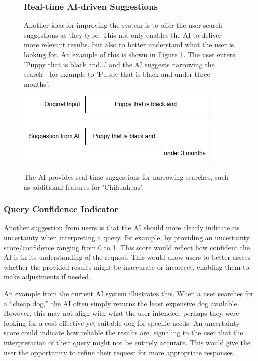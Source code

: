 \documentclass[../../submission.tex]{subfiles}
\begin{document}
\begin{figure}[h]
    \centering
    \begin{minipage}{0.35\textwidth}
        \subsubsection{Real-time AI-driven Suggestions}
        Another idea for improving the system is to offer the user search suggestions as they type. 
        This not only enables the AI to deliver more relevant results, but also to better understand what the user is looking for.
        An example of this is shown in Figure \ref{fig:suggestions}. The user enters 'Puppy that is black and...' and the AI suggests narrowing the 
        search - for example to 'Puppy that is black and under three months'.
    \end{minipage}
    \hfill
    \begin{minipage}{0.55\textwidth}
        \includegraphics[width=\textwidth]{images/vorschlag}
        \caption{The AI provides real-time suggestions for narrowing searches, such as additional features for 'Chihuahuas'.}
        \Description{}
        \label{fig:suggestions}
    \end{minipage}
\end{figure}
 

 
 \subsubsection{Query Confidence Indicator}   
 
 Another suggestion from users is that the AI should more clearly indicate its uncertainty 
 when interpreting a query, for example, by providing an uncertainty score/confidence ranging from 
 0 to 1. This score would reflect how confident the AI is in its understanding of the 
 request. This would allow users to better assess whether the provided results might 
 be inaccurate or incorrect, enabling them to make adjustments if needed.

 An example from the current AI system illustrates this. When a user searches for 
 a “cheap dog,” the AI often simply returns the least expensive dog available. 
 However, this may not align with what the user intended; perhaps they were looking 
 for a cost-effective yet suitable dog for specific needs. An uncertainty score could 
 indicate how reliable the results are, signaling to the user that the interpretation 
 of their query might not be entirely accurate. This would give the user the opportunity 
 to refine their request for more appropriate responses.
\end{document}
